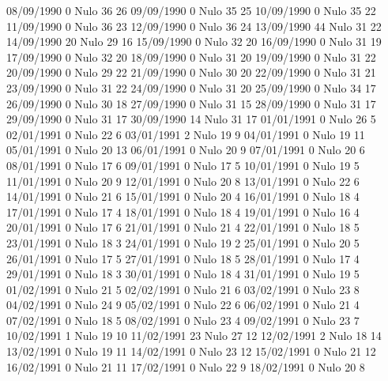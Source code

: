 08/09/1990  0     Nulo    36     26 
09/09/1990  0     Nulo    35     25 
10/09/1990  0     Nulo    35     22 
11/09/1990  0     Nulo    36     23 
12/09/1990  0     Nulo    36     24 
13/09/1990  44    Nulo    31     22 
14/09/1990  20    Nulo    29     16 
15/09/1990  0     Nulo    32     20 
16/09/1990  0     Nulo    31     19 
17/09/1990  0     Nulo    32     20 
18/09/1990  0     Nulo    31     20 
19/09/1990  0     Nulo    31     22 
20/09/1990  0     Nulo    29     22 
21/09/1990  0     Nulo    30     20 
22/09/1990  0     Nulo    31     21 
23/09/1990  0     Nulo    31     22 
24/09/1990  0     Nulo    31     20 
25/09/1990  0     Nulo    34     17 
26/09/1990  0     Nulo    30     18 
27/09/1990  0     Nulo    31     15 
28/09/1990  0     Nulo    31     17 
29/09/1990  0     Nulo    31     17 
30/09/1990  14    Nulo    31     17 
01/01/1991  0     Nulo    26     5 
02/01/1991  0     Nulo    22     6 
03/01/1991  2     Nulo    19     9 
04/01/1991  0     Nulo    19     11 
05/01/1991  0     Nulo    20     13 
06/01/1991  0     Nulo    20     9 
07/01/1991  0     Nulo    20     6 
08/01/1991  0     Nulo    17     6 
09/01/1991  0     Nulo    17     5 
10/01/1991  0     Nulo    19     5 
11/01/1991  0     Nulo    20     9 
12/01/1991  0     Nulo    20     8 
13/01/1991  0     Nulo    22     6 
14/01/1991  0     Nulo    21     6 
15/01/1991  0     Nulo    20     4 
16/01/1991  0     Nulo    18     4 
17/01/1991  0     Nulo    17     4 
18/01/1991  0     Nulo    18     4 
19/01/1991  0     Nulo    16     4 
20/01/1991  0     Nulo    17     6 
21/01/1991  0     Nulo    21     4 
22/01/1991  0     Nulo    18     5 
23/01/1991  0     Nulo    18     3 
24/01/1991  0     Nulo    19     2 
25/01/1991  0     Nulo    20     5 
26/01/1991  0     Nulo    17     5 
27/01/1991  0     Nulo    18     5 
28/01/1991  0     Nulo    17     4 
29/01/1991  0     Nulo    18     3 
30/01/1991  0     Nulo    18     4 
31/01/1991  0     Nulo    19     5 
01/02/1991  0     Nulo    21     5 
02/02/1991  0     Nulo    21     6 
03/02/1991  0     Nulo    23     8 
04/02/1991  0     Nulo    24     9 
05/02/1991  0     Nulo    22     6 
06/02/1991  0     Nulo    21     4 
07/02/1991  0     Nulo    18     5 
08/02/1991  0     Nulo    23     4 
09/02/1991  0     Nulo    23     7 
10/02/1991  1     Nulo    19     10 
11/02/1991  23    Nulo    27     12 
12/02/1991  2     Nulo    18     14 
13/02/1991  0     Nulo    19     11 
14/02/1991  0     Nulo    23     12 
15/02/1991  0     Nulo    21     12 
16/02/1991  0     Nulo    21     11 
17/02/1991  0     Nulo    22     9 
18/02/1991  0     Nulo    20     8 
